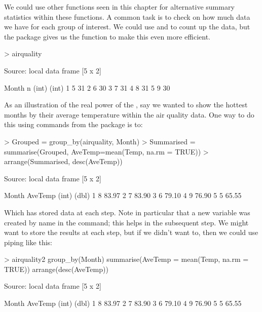 We could use other functions seen in this chapter for alternative summary statistics within these functions. A common task is to check on how much data we have for each group of interest. We could use  and  to count up the data, but the  package gives us the  function to make this even more efficient.
\begin{Schunk}
\begin{Sinput}
> airquality%>% count(Month)
\end{Sinput}
\begin{Soutput}
Source: local data frame [5 x 2]

  Month     n
  (int) (int)
1     5    31
2     6    30
3     7    31
4     8    31
5     9    30
\end{Soutput}
\end{Schunk}


As an illustration of the real power of the , say we wanted to show the hottest months by their average temperature within the air quality data. One way to do this using commands from the  package is to:
\begin{Schunk}
\begin{Sinput}
> Grouped = group_by(airquality, Month)
> Summarised = summarise(Grouped, AveTemp=mean(Temp, na.rm = TRUE))
> arrange(Summarised, desc(AveTemp))
\end{Sinput}
\begin{Soutput}
Source: local data frame [5 x 2]

  Month AveTemp
  (int)   (dbl)
1     8   83.97
2     7   83.90
3     6   79.10
4     9   76.90
5     5   65.55
\end{Soutput}
\end{Schunk}
Which has stored data at each step. Note in particular that a new variable was created by name in the  command; this helps in the subsequent  step. We might want to store the results at each step, but if we didn't want to, then we could use piping like this:
\begin{Schunk}
\begin{Sinput}
> airquality2 %>%
   group_by(Month) %>%
   summarise(AveTemp = mean(Temp, na.rm = TRUE))  %>%
   arrange(desc(AveTemp))
\end{Sinput}
\begin{Soutput}
Source: local data frame [5 x 2]

  Month AveTemp
  (int)   (dbl)
1     8   83.97
2     7   83.90
3     6   79.10
4     9   76.90
5     5   65.55
\end{Soutput}
\end{Schunk}

